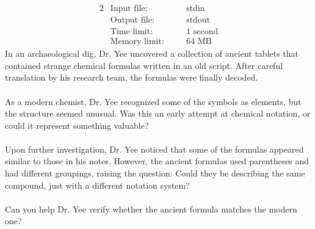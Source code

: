 \documentclass[12pt,a4paper]{article}
\begin{document}
\begin{alignat*} {2}
 &   \text{Input file:}   \quad     &&\text{stdin}\\
 &   \text{Output file:}  \quad     &&\text{stdout}\\
 &   \text{Time limit:}   \quad     &&\text{1 second}\\
 &   \text{Memory limit:} \quad     &&\text{64 MB}
\end{alignat*}
\noindent
In an archaeological dig, Dr. Yee uncovered a collection of ancient tablets that contained strange chemical formulas written in an old script. After careful translation by his research team, the formulas were finally decoded.
\\\\
\noindent
As a modern chemist, Dr. Yee recognized some of the symbols as elements, but the structure seemed unusual. Was this an early attempt at chemical notation, or could it represent something valuable?
\\\\
\noindent
Upon further investigation, Dr. Yee noticed that some of the formulas appeared similar to those in his notes. However, the ancient formulas used parentheses and had different groupings, raising the question: Could they be describing the same compound, just with a different notation system?
\\\\
\noindent
Can you help Dr. Yee verify whether the ancient formula matches the modern one?
\end{document}
